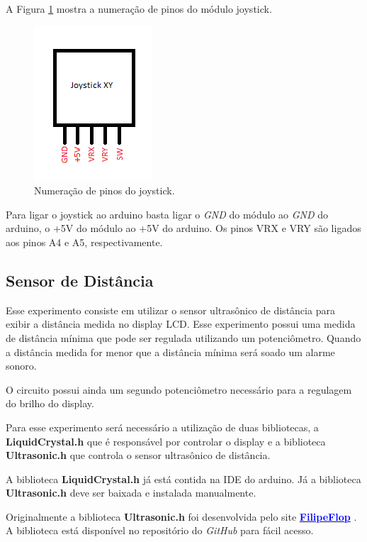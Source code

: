 \documentclass[12pt]{article}
\begin{document}
A Figura \ref{figPinosJoystick} mostra a numeração de pinos do módulo joystick.

\begin{figure}[H]
	\centering
	\includegraphics[scale=0.7]{Imagens/Experimentos/5-LEDMatrix/pinosJoy.png}
	\caption{Numeração de pinos do joystick.}
	\label{figPinosJoystick}
\end{figure}

Para ligar o joystick ao arduino basta ligar o \textit{GND} do módulo ao \textit{GND} do arduino, o +5V do módulo ao +5V do arduino. Os pinos VRX e VRY são ligados aos pinos A4 e A5, respectivamente.

\subsection{Sensor de Distância}
Esse experimento consiste em utilizar o sensor ultrasônico de distância para exibir a distância medida no display LCD. Esse experimento possui uma medida de distância mínima que pode ser regulada utilizando um potenciômetro. Quando a distância medida for menor que a distância mínima será soado um alarme sonoro.

O circuito possui ainda um segundo potenciômetro necessário para a regulagem do brilho do display.

Para esse experimento será necessário a utilização de duas bibliotecas, a \textbf{LiquidCrystal.h} que é responsável por controlar o display e a biblioteca \textbf{Ultrasonic.h} que controla o sensor ultrasônico de distância.

A biblioteca \textbf{LiquidCrystal.h} já está contida na IDE do arduino. Já a biblioteca \textbf{Ultrasonic.h} deve ser baixada e instalada manualmente.

Originalmente a biblioteca \textbf{Ultrasonic.h} foi desenvolvida pelo site \href{https://www.filipeflop.com/blog/sensor-ultrassonico-hc-sr04-ao-arduino/}{\textcolor{blue}{\textbf{FilipeFlop}}} \cite{siteUltrasonic}. A biblioteca está disponível no repositório do \textit{GitHub} para fácil acesso.
\end{document}
